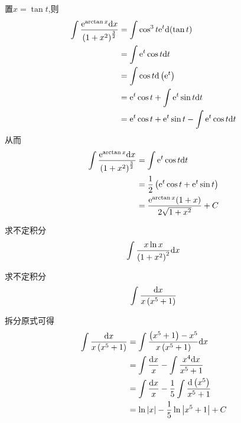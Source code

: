 \documentclass{ctexart}
\begin{document}
\begin{solution}
    置$x=\tan t$,则
    $$\begin{aligned}
        \int\dfrac{\mathrm{e}^{\arctan{x}}\mathrm{d} x}{\left(1+x^2\right)^\frac{3}{2}}
        &= \int{\cos^3t\mathrm{e}^t\mathrm{d}(\tan t)} \\
        &= \int{\mathrm{e}^t\cos t\mathrm{d}t} \\
        &= \int{\cos t\mathrm{d}\left(\mathrm{e}^t\right)} \\
        &= \mathrm{e}^t\cos t+\int{\mathrm{e}^t\sin t\mathrm{d}t} \\
        &= \mathrm{e}^t\cos t+\mathrm{e}^t\sin t-\int{\mathrm{e}^t\cos t\mathrm{d}t}
    \end{aligned}$$
    从而$$\begin{aligned}
        \int\dfrac{\mathrm{e}^{\arctan{x}}\mathrm{d} x}{\left(1+x^2\right)^\frac{3}{2}}
        &= \int{\mathrm{e}^t\cos t\mathrm{d}t} \\
        &= \dfrac{1}{2}\left(\mathrm{e}^t\cos t+\mathrm{e}^t\sin t\right) \\
        &= \dfrac{\mathrm{e}^{\arctan{x}}(1+x)}{2\sqrt{1+x^2}}+C
    \end{aligned}$$
\end{solution}
\begin{problem}[Problem 7.]
    求不定积分$$\int{\dfrac{x\ln{x}}{\left(1+x^2\right)^2}\mathrm{d}x}$$
\end{problem}
\begin{solution}[Solution.]
    
\end{solution}
\begin{problem}[Problem 8.]
    求不定积分$$\int{\dfrac{\mathrm{d}x}{x\left(x^5+1\right)}}$$
\end{problem}
\begin{solution}[Solution.]
    拆分原式可得
    $$\begin{aligned}
        \int{\dfrac{\mathrm{d}x}{x\left(x^5+1\right)}}
        &= \int{\dfrac{\left(x^5+1\right)-x^5}{x\left(x^5+1\right)}\mathrm{d}x} \\
        &= \int\dfrac{\mathrm{d} x}{x}-\int\dfrac{x^4\mathrm{d} x}{x^5+1} \\
        &= \int\dfrac{\mathrm{d} x}{x}-\dfrac{1}{5}\int\dfrac{\mathrm{d}\left(x^5\right)}{x^5+1} \\
        &= \ln{\left|x\right|}-\dfrac{1}{5}\ln{\left|x^5+1\right|}+C
    \end{aligned}$$
\end{solution}
\end{document}

